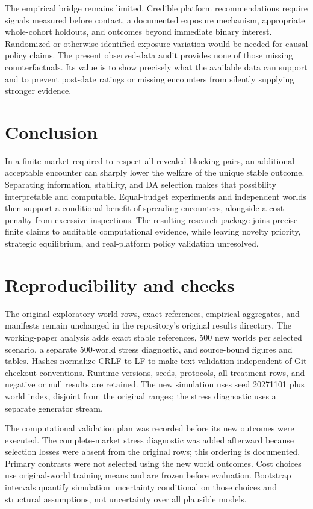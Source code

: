 \documentclass[11pt,a4paper]{article}
\begin{document}
The empirical bridge remains limited. Credible platform recommendations require signals measured before contact, a documented exposure mechanism, appropriate whole-cohort holdouts, and outcomes beyond immediate binary interest. Randomized or otherwise identified exposure variation would be needed for causal policy claims. The present observed-data audit provides none of those missing counterfactuals. Its value is to show precisely what the available data can support and to prevent post-date ratings or missing encounters from silently supplying stronger evidence.

\section{Conclusion}
In a finite market required to respect all revealed blocking pairs, an additional acceptable encounter can sharply lower the welfare of the unique stable outcome. Separating information, stability, and DA selection makes that possibility interpretable and computable. Equal-budget experiments and independent worlds then support a conditional benefit of spreading encounters, alongside a cost penalty from excessive inspections. The resulting research package joins precise finite claims to auditable computational evidence, while leaving novelty priority, strategic equilibrium, and real-platform policy validation unresolved.

\appendix
\section{Reproducibility and checks}\label{app:repro}
The original exploratory world rows, exact references, empirical aggregates, and manifests remain unchanged in the repository's original results directory. The working-paper analysis adds exact stable references, 500 new worlds per selected scenario, a separate 500-world stress diagnostic, and source-bound figures and tables. Hashes normalize CRLF to LF to make text validation independent of Git checkout conventions. Runtime versions, seeds, protocols, all treatment rows, and negative or null results are retained. The new simulation uses seed 20271101 plus world index, disjoint from the original ranges; the stress diagnostic uses a separate generator stream.

The computational validation plan was recorded before its new outcomes were executed. The complete-market stress diagnostic was added afterward because selection losses were absent from the original rows; this ordering is documented. Primary contrasts were not selected using the new world outcomes. Cost choices use original-world training means and are frozen before evaluation. Bootstrap intervals quantify simulation uncertainty conditional on those choices and structural assumptions, not uncertainty over all plausible models.
\end{document}
